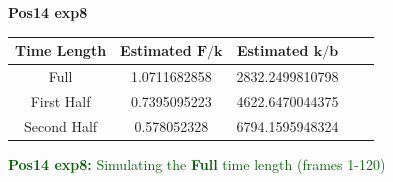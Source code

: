 \documentclass[12pt]{article}
\begin{document}
\vspace*{1in}
{\LARGE \textbf{Pos14 exp8}}
\vspace{.5in}
\begin{table}[h!]
    \begin{center}
    \Large
	\renewcommand{\arraystretch}{1.3}
        \begin{tabular}{|c|c|c|c|c|}
            \hline
		\textbf{Time Length} & \textbf{Estimated} $\boldsymbol F/\boldsymbol k$ & \textbf{Estimated} $\boldsymbol k/\boldsymbol b$ \\ \hline
		Full & 1.0711682858 & 2832.2499810798 \\ \hline
		First Half & 0.7395095223 & 4622.6470044375 \\ \hline
		Second Half & 0.578052328 & 6794.1595948324 \\ \hline
        \end{tabular}
     \end{center}
\end{table}

\clearpage

\noindent \textcolor{DarkGreen}{\textbf{Pos14 exp8:} Simulating the \textbf{Full} time length (frames 1-120)}
\end{document}
